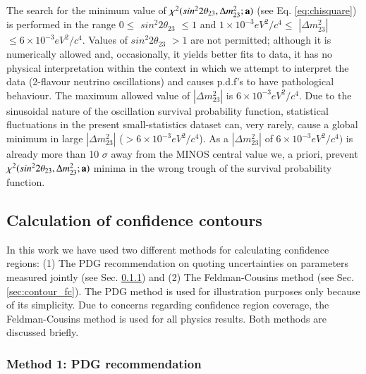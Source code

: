 The search for the minimum value of 
$\chi^{2} (sin^{2}2\theta_{23},\Delta m^{2}_{23}; {\bf a})$ (see Eq. \ref{eq:chisquare}) 
is performed in the range 
$0 \leq$ $sin^{2}2\theta_{23}$ $\leq 1$ and
$1 \times 10^{-3} eV^{2}/c^{4} \leq$ $|\Delta m^{2}_{23}|$ $\leq 6 \times 10^{-3} eV^{2}/c^{4}$.
Values of $sin^{2}2\theta_{23}$ $> 1$  are not permitted; although it is numerically allowed and,
occasionally, it yields better fits to data, it has no physical interpretation within the context
in which we attempt to interpret the data (2-flavour neutrino oscillations) and causes p.d.f's to 
have pathological behaviour.
The maximum allowed value of $|\Delta m^{2}_{23}|$ is $6 \times 10^{-3} eV^{2}/c^{4}$.
Due to the sinusoidal nature of the oscillation survival probability function,
statistical fluctuations in the present small-statistics dataset can, very rarely, 
cause a global minimum in large $|\Delta m^{2}_{23}|$ ($> 6 \times 10^{-3} eV^{2}/c^{4}$). 
As a $|\Delta m^{2}_{23}|$ of $6 \times 10^{-3} eV^{2}/c^{4})$ is already more than 10 $\sigma$
away from the MINOS central value we, a priori, prevent $\chi^{2} (sin^{2}2\theta_{23},\Delta m^{2}_{23}; {\bf a})$ 
minima in the wrong trough of the survival probability function.

%
%
%
%

\subsection {Calculation of confidence contours}
\label{sec:contours}

In this work we have used two different methods for calculating confidence regions:
(1) The PDG recommendation on quoting uncertainties on parameters measured jointly (see Sec. \ref{sec:contour_pdg}) and 
(2) The Feldman-Cousins method (see Sec. \ref{sec:contour_fc}).
The PDG method is used for illustration purposes only because of its simplicity.
Due to concerns regarding confidence region coverage, 
the Feldman-Cousins method is used for all physics results.
Both methods are discussed briefly.

\subsubsection {Method 1: PDG recommendation}
\label{sec:contour_pdg}

